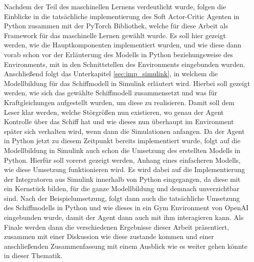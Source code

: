\documentclass[]{iat}
\begin{document}
Nachdem der Teil des maschinellen Lernens verdeutlicht wurde, folgen die Einblicke in die tatsächliche implementierung des Soft Actor-Critic Agenten in Python zusammen mit der PyTorch Bibliothek, welche für diese Arbeit als Framework für das maschinelle Lernen gewählt wurde. Es soll hier gezeigt werden, wie die Hauptkomponenten implementiert wurden, und wie diese dann vorab schon vor der Erläuterung des Modells in Python beziehungsweise des Environments, mit in den Schnittstellen des Environments eingebunden wurden. Anschließend folgt das Unterkapitel \ref{sec:imp_simulink}, in welchem die Modellbildung für das Schiffmodell in Simulink erläutert wird. Hierbei soll gezeigt werden, wie sich das gewählte Schiffmodell zusammensetzt und was für Kraftgleichungen aufgestellt wurden, um diese zu realisieren. Damit soll dem Leser klar werden, welche Störgrößen nun existieren, wo genau der Agent Kontrolle über das Schiff hat und wie dieses nun überhaupt im Environment später sich verhalten wird, wenn dann die Simulationen anfangen. Da der Agent in Python jetzt zu diesem Zeitpunkt bereits implementiert wurde, folgt auf die Modellbildung in Simulink auch schon die Umsetzung des erstellten Modells in Python. Hierfür soll vorerst gezeigt werden, Anhang eines einfacheren Modells, wie diese Umsetzung funktionieren wird. Es wird dabei auf die Implementierung der Integratoren aus Simulink innerhalb von Python eingegangen, da diese mit ein Kernstück bilden, für die ganze Modellbildung und demnach unverzichtbar sind. Nach der Beispielumsetzung, folgt dann auch die tatsächliche Umsetzung des Schiffmodells in Python und wie dieses in ein Gym Environment von OpenAI \cite[]{brockman2016openai} eingebunden wurde, damit der Agent dann auch mit ihm interagieren kann. Als Finale werden dann die verschiedenen Ergebnisse dieser Arbeit präsentiert, zusammen mit einer Diskussion wie diese zustande kommen und einer anschließenden Zusammenfassung mit einem Ausblick wie es weiter gehen könnte in dieser Thematik.
\end{document}
